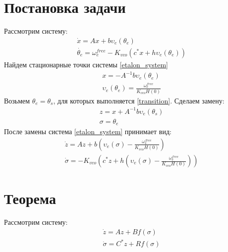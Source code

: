 \documentclass[a4paper,14pt]{extarticle} %
\begin{document}
\section{Постановка задачи}
Рассмотрим систему:
 \begin{equation}\label{etalon_system}
 \begin{aligned}
 &\dot{x} = Ax + b\upsilon_e(\theta_e)\\
 &\dot{\theta_e} = \omega_e^{free} - K_{vco}(c^*x + h\upsilon_e(\theta_e))
 \end{aligned}
\end{equation}
Найдем стационарные точки системы \eqref{etalon_system}
 \begin{equation}\label{transition}
 \begin{aligned}
 &x = -A^{-1}b\upsilon_e(\theta_e)\\
 &\upsilon_e(\theta_e) = \frac{\omega_e^{free}}{K_{vco}H(0)}
 \end{aligned}
\end{equation}
Возьмем $\theta_e = \theta_s$, для которых выполняется \eqref{transition}. Сделаем замену:
 \begin{equation}\label{replacement1}
 \begin{aligned}
 &z =x + A^{-1}b\upsilon_e(\theta_s)\\
 &\sigma = \theta_e 
 \end{aligned}
\end{equation}
После замены система \eqref{etalon_system} принимает вид:
 \begin{equation}
 \begin{aligned}
 &\dot{z} = Az + b(\upsilon_e(\sigma) - \frac{\omega_e^{free}}{K_{vco}H(0)})\\
 &\dot{\sigma} = -K_{vco}(c^*z + h(\upsilon_e(\sigma) - \frac{\omega_e^{free}}{K_{vco}H(0)}))
 \end{aligned}
\end{equation}

\section{Теорема}
Рассмотрим систему:
 \begin{equation}\label{system}
 \begin{aligned}
 &\dot{z} = Az + Bf(\sigma)\\
 &\dot{\sigma} = C^*z + Rf(\sigma)
 \end{aligned}
\end{equation}
\end{document}
